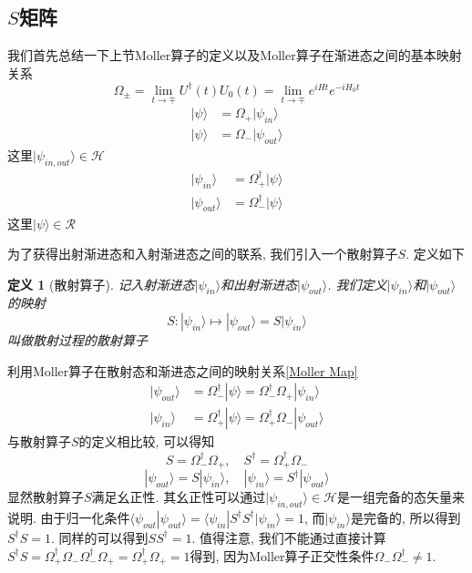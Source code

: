 \documentclass[a4paper,11pt]{book}
\newtheorem{definition}{\hspace{2em}定义}[section]
\begin{document}
\subsection{$S$矩阵}
我们首先总结一下上节Moller算子的定义以及Moller算子在渐进态之间的基本映射关系
\begin{equation}
  \Omega_\pm=\lim_{t\to\mp}U^\dag(t)U_0(t)=\lim_{t\to\mp}e^{iHt}e^{-iH_0t}
\end{equation}
\begin{equation}\label{Moller Map}
  \begin{split}
     |\psi\rangle & =\Omega_+|\psi_{in}\rangle \\
     |\psi\rangle & =\Omega_-|\psi_{out}\rangle
  \end{split}
\end{equation}
这里$|\psi_{in,out}\rangle\in\mathcal{H}$
\begin{equation}
  \begin{split}
     |\psi_{in}\rangle & =\Omega_+^\dag|\psi\rangle \\
     |\psi_{out}\rangle & =\Omega_-^\dag|\psi\rangle
  \end{split}
\end{equation}
这里$|\psi\rangle\in\mathcal{R}$

为了获得出射渐进态和入射渐进态之间的联系, 我们引入一个散射算子$S$. 定义如下
\begin{definition}[散射算子]\label{S-matrix def}
  记入射渐进态$|\psi_{in}\rangle$和出射渐进态$|\psi_{out}\rangle$. 我们定义$|\psi_{in}\rangle$和$|\psi_{out}\rangle$的映射
  \begin{equation}
    S:|\psi_{in}\rangle\mapsto|\psi_{out}\rangle=S|\psi_{in}\rangle
  \end{equation}
  叫做散射过程的散射算子
\end{definition}
利用Moller算子在散射态和渐进态之间的映射关系\eqref{Moller Map}
\begin{equation}
  \begin{split}
     |\psi_{out}\rangle&=\Omega_-^\dag|\psi\rangle=\Omega_-^\dag\Omega_+|\psi_{in}\rangle\\
     |\psi_{in}\rangle&=\Omega_+^\dag|\psi\rangle=\Omega_+^\dag\Omega_-|\psi_{out}\rangle
  \end{split}
\end{equation}
与散射算子$S$的定义相比较, 可以得知
\begin{equation}
  S=\Omega_-^\dag\Omega_+,\quad S^\dag=\Omega_+^\dag\Omega_-
\end{equation}
\begin{equation}
  |\psi_{out}\rangle=S|\psi_{in}\rangle,\quad |\psi_{in}\rangle=S^\dag|\psi_{out}\rangle
\end{equation}
显然散射算子$S$满足幺正性. 其幺正性可以通过$|\psi_{in,out}\rangle\in\mathcal{H}$是一组完备的态矢量来说明. 由于归一化条件$\langle\psi_{out}|\psi_{out}\rangle=\langle\psi_{in}|S^\dag S^\dag|\psi_{in}\rangle=1$, 而$|\psi_{in}\rangle$是完备的, 所以得到$S^\dag S=1$. 同样的可以得到$SS^\dag=1$. 值得注意, 我们不能通过直接计算$S^\dag S=\Omega_+^\dag\Omega_-\Omega_-^\dag\Omega_+=\Omega_+^\dag\Omega_+=1$得到, 因为Moller算子正交性条件$\Omega_-\Omega_-^\dag\neq1$.
\end{document}
